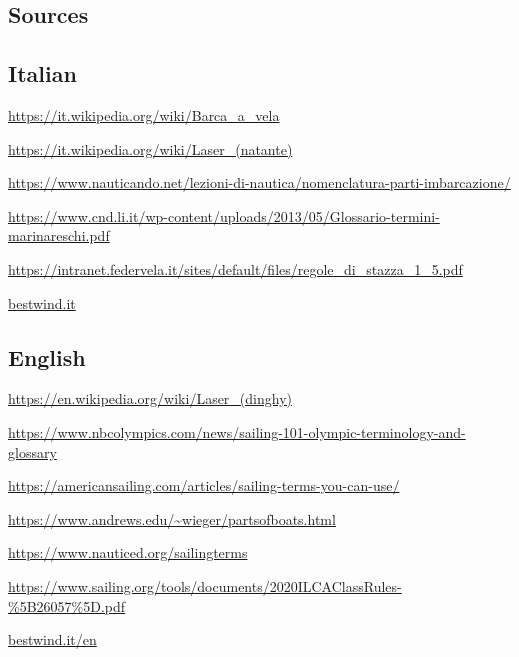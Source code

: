 \documentclass[a4paper, 12pt, twoside]{article}
\begin{document}
    \begin{indt}{\section{Sources}} %
        \begin{indt}{\subsection{Italian}} %
            \url{https://it.wikipedia.org/wiki/Barca_a_vela}

            \url{https://it.wikipedia.org/wiki/Laser_(natante)}

            \href{https://www.nauticando.net/lezioni-di-nautica/nomenclatura-parti-imbarcazione/}{{https://www.nauticando.net/lezioni-di-nautica/nomenclatura-parti-imbarcazione/}}

            \href{https://www.cnd.li.it/wp-content/uploads/2013/05/Glossario-termini-marinareschi.pdf}{https://www.cnd.li.it/wp-content/uploads/2013/05/Glossario-termini-marinareschi.pdf}

            \url{https://intranet.federvela.it/sites/default/files/regole_di_stazza_1_5.pdf}

            \url{bestwind.it}
        \end{indt} %

        \begin{indt}{\subsection{English}} %
            \url{https://en.wikipedia.org/wiki/Laser_(dinghy)}

            \url{https://www.nbcolympics.com/news/sailing-101-olympic-terminology-and-glossary}

            \url{https://americansailing.com/articles/sailing-terms-you-can-use/}

            \url{https://www.andrews.edu/~wieger/partsofboats.html}

            \url{https://www.nauticed.org/sailingterms}

            \url{https://www.sailing.org/tools/documents/2020ILCAClassRules-%5B26057%5D.pdf}

            \url{bestwind.it/en}
        \end{indt} %
    \end{indt} %
    
\end{document}
